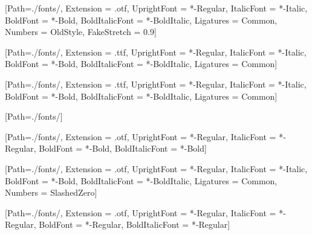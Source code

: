 [Path=./fonts/,
  Extension      = .otf,
  UprightFont    = *-Regular,
  ItalicFont     = *-Italic,
  BoldFont       = *-Bold,
  BoldItalicFont = *-BoldItalic,
  Ligatures       = Common,
  Numbers         = OldStyle,
  FakeStretch     = 0.9]



[Path=./fonts/,
  Extension      = .ttf,
  UprightFont    = *-Regular,
  ItalicFont     = *-Italic,
  BoldFont       = *-Bold,
  BoldItalicFont = *-BoldItalic,
  Ligatures      = Common]


[Path=./fonts/,
  Extension      = .ttf,
  UprightFont    = *-Regular,
  ItalicFont     = *-Italic,
  BoldFont       = *-Bold,
  BoldItalicFont = *-BoldItalic,
  Ligatures      = Common]

[Path=./fonts/]

[Path=./fonts/,
  Extension      = .otf,
  UprightFont    = *-Regular,
  ItalicFont     = *-Regular,
  BoldFont       = *-Bold,
  BoldItalicFont = *-Bold]

[Path=./fonts/,
  Extension      = .otf,
  UprightFont    = *-Regular,
  ItalicFont     = *-Italic,
  BoldFont       = *-Bold,
  BoldItalicFont = *-BoldItalic,
  Ligatures       = Common,
  Numbers         = SlashedZero]

[Path=./fonts/,
  Extension      = .otf,
  UprightFont    = *-Regular,
  ItalicFont     = *-Regular,
  BoldFont       = *-Regular,
  BoldItalicFont = *-Regular]
